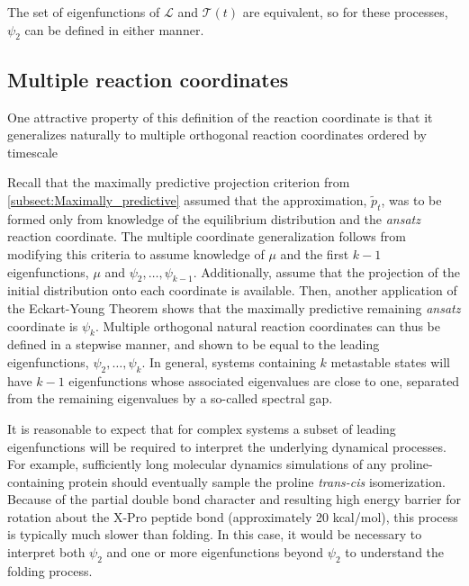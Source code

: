 \documentclass[aip, jcp, reprint, nolinenumbers, twocolumn, nobalancelastpage]{revtex4-1}
\begin{document}
The set of eigenfunctions of $\mathcal{L}$ and $\mathcal{T}(t)$ are equivalent, so for these processes, $\psi_2$ can be defined in either manner.

\subsection{Multiple reaction coordinates}
\label{subsect:multiple_reaction_coordinates}
One attractive property of this definition of the reaction coordinate is that it generalizes naturally to multiple orthogonal reaction coordinates ordered by timescale

Recall that the maximally predictive projection criterion from \cref{subsect:Maximally_predictive} assumed that the approximation, $\tilde{p}_t$, was to be formed only from knowledge of the equilibrium distribution and the \emph{ansatz} reaction coordinate. The multiple coordinate generalization follows from modifying this criteria to assume knowledge of $\mu$ and the first $k-1$ eigenfunctions, $\mu$ and $\psi_2, \ldots, \psi_{k-1}$. Additionally, assume that the projection of the initial distribution onto each coordinate is available. Then, another application of the Eckart-Young Theorem shows that the maximally predictive remaining \emph{ansatz} coordinate is $\psi_{k}$. Multiple orthogonal natural reaction coordinates can thus be defined in a stepwise manner, and shown to be equal to the leading eigenfunctions, $\psi_2, \ldots, \psi_k$. In general, systems containing $k$ metastable states will have $k-1$ eigenfunctions whose associated eigenvalues are close to one, separated from the remaining eigenvalues by a so-called spectral gap.\cite{prinz2011markov}

It is reasonable to expect that for complex systems a subset of leading eigenfunctions will be required to interpret the underlying dynamical processes. For example, sufficiently long molecular dynamics simulations of any proline-containing protein should eventually sample the proline \textit{trans-cis} isomerization. Because of the partial double bond character and resulting high energy barrier for rotation about the X-Pro peptide bond (approximately 20 kcal/mol), this process is typically much slower than folding.\cite{Wedemeyer_Biochemistry02, Banushkina_JCP15} In this case, it would be necessary to interpret both $\psi_2$ and one or more eigenfunctions beyond $\psi_2$ to understand the folding process.
\end{document}
